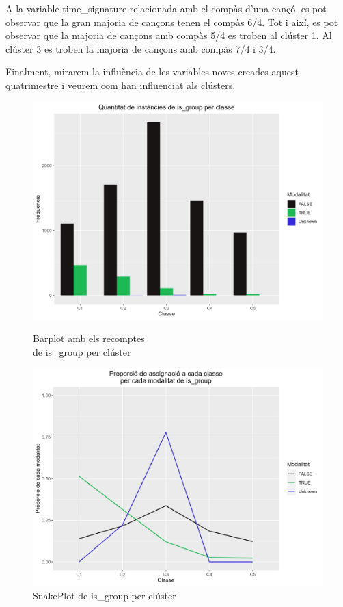 \documentclass{article}
\begin{document}
A la variable time\_signature relacionada amb el compàs d'una cançó, es pot observar que la gran majoria de cançons tenen el compàs 6/4. Tot i així, es pot observar que la majoria de cançons amb compàs 5/4 es troben al clúster 1. Al clúster 3 es troben la majoria de cançons amb compàs 7/4 i 3/4.

Finalment, mirarem la influència de les variables noves creades aquest quatrimestre i veurem com han influenciat als clústers. 

\begin{figure}[H]
\centering
    \begin{minipage}{.49\textwidth}
        \centering
        \includegraphics[width=0.95\linewidth]{Images/5_Profiling/categoriques/cat/Cat_BarPlot_is_group.png}
        \caption{Barplot amb els recomptes \\ de is\_group per clúster}
        \label{fig:Cat_BarPlot_is_group}
    \end{minipage}%
    \begin{minipage}{.49\textwidth}
        \centering
        \includegraphics[width=0.95\linewidth]{Images/5_Profiling/categoriques/cat/Cat_SnakePlot_is_group.png}
        \caption{SnakePlot de is\_group per clúster}
        \label{fig:Cat_SnakePlot_is_group}
    \end{minipage}%
\end{figure}
\end{document}
